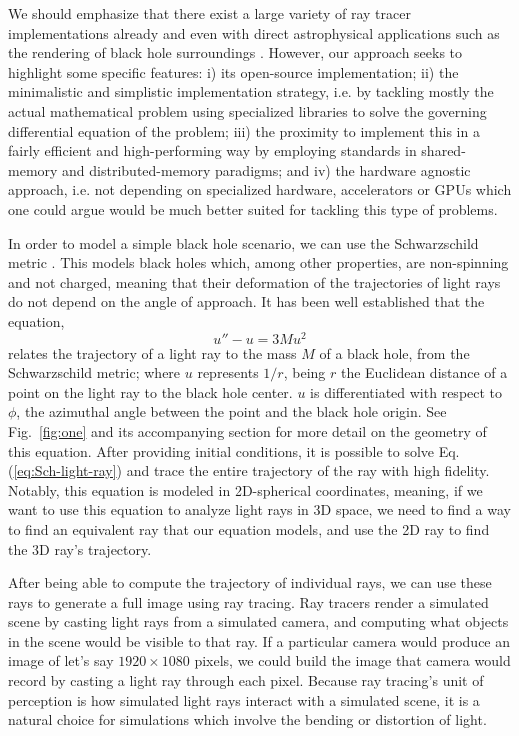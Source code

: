 We should emphasize that there exist a large variety of ray tracer implementations already 
\cite{imbens2023graphicalprocessinggeodesicpropagation,10.2312/EGPGV/EGPGV12/051-060,7539599_OSPRay}
and even with direct astrophysical applications such as the rendering of black hole surroundings
\cite{10.2312:vmv.20221208,sharma2023mahakalapythonbasedmodularraytracing,James_2015}.
However, our approach seeks to highlight some specific features:
i) its open-source implementation;
ii) the minimalistic and simplistic implementation strategy, i.e. by tackling
mostly the actual mathematical problem using specialized libraries
to solve the governing differential equation of the problem;
iii) the proximity  to implement this in a fairly efficient and high-performing
way by employing standards in shared-memory and distributed-memory paradigms;
and iv) the hardware agnostic approach, i.e. not depending on specialized hardware, accelerators or GPUs which one could argue would be much better suited for tackling this type of problems.

In order to model a simple black hole scenario, we can use the Schwarzschild metric \cite{schw_soln-2007}.
This models black holes which, among other properties, are non-spinning and not charged,
meaning that their deformation of the trajectories of light rays do not depend on the angle of approach.
It has been well established \cite{gravitation-mtw} that the equation,
\begin{equation}
	u'' - u = 3 M u^2
	\label{eq:Sch-light-ray}
\end{equation}
relates the trajectory of a light ray to the mass $M$ of a black hole, from the Schwarzschild metric;
where $u$ represents $1/r$, being $r$ the Euclidean distance of a point on the light ray to the black hole center.
$u$ is differentiated with respect to $\phi$, the azimuthal angle between the point and the black hole origin.
See Fig.~\ref{fig:one} and its accompanying section for more detail on the geometry of this equation.
After providing initial conditions,  it is possible to solve Eq.(\ref{eq:Sch-light-ray}) and trace the entire trajectory of the ray with high fidelity.
Notably, this equation is modeled in 2D-spherical coordinates, meaning, if we want to use this equation to analyze light rays in 3D space, we need to find a way to find an equivalent ray that our equation models, and use the 2D ray to find the 3D ray's trajectory.

After being able to compute the trajectory of individual rays, we can use these rays to generate a full image using ray tracing. Ray tracers render a simulated scene by casting light rays from a simulated camera, and computing what objects in the scene would be visible to that ray. If a particular camera would produce an image of let's say $1920 \times 1080$ pixels, we could build the image that camera would record by casting a light ray through each pixel. Because ray tracing's unit of perception is how simulated light rays interact with a simulated scene, it is a natural choice for simulations which involve the bending or distortion of light.

